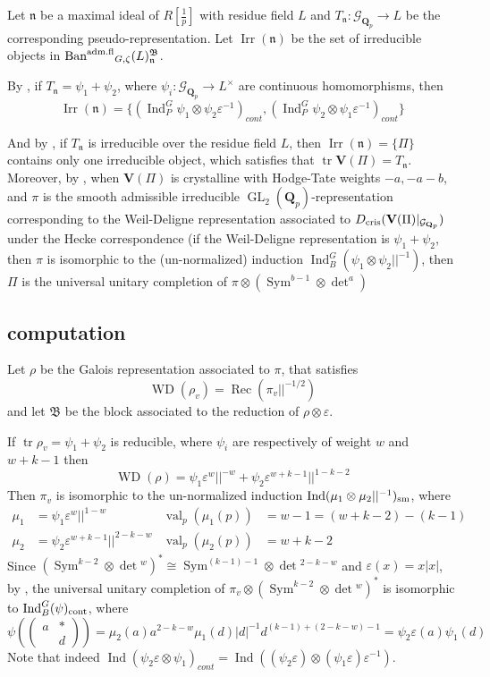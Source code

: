 \documentclass[leqno]{amsart}
\newcommand{\smat}[1]{\left( \begin{smallmatrix} #1 \end{smallmatrix} \right)}
\newcommand{\Gp}{\mathcal{G}_{\Qp}} %
\DeclareMathOperator{\Ban}{\textnormal{Ban}^{\textnormal{adm.fl}}}
\DeclareMathOperator{\Irr}{Irr}
\DeclareMathOperator{\WD}{WD}
\newcommand{\cris}{\textnormal{cris}}
\newcommand{\cont}{\textnormal{cont}}
\newcommand{\sm}{\textnormal{sm}}
\DeclareMathOperator{\GL}{GL}
\DeclareMathOperator{\mtr}{tr}
\DeclareMathOperator{\Sym}{Sym}
\DeclareMathOperator{\val}{val}
\newcommand{\Qp}{\mathbf{Q}_p}
\newcommand{\1}{\mathbf{1}}
\newcommand{\B}{\mathfrak B}
\newcommand{\fn}{\mathfrak n}
\DeclareMathOperator{\Ind}{Ind}
\DeclareMathOperator{\Rec}{Rec}
\theoremstyle{definition}
\theoremstyle{remark}
\begin{document}
Let $\fn$ be a maximal ideal of  $R[\frac{1}{p}]$
with residue field  $L$ and 
$T_\fn\colon \Gp\to L$ 
be the corresponding pseudo-representation.
Let  $\Irr(\fn)$
be the set of irreducible objects in  $\Ban_{G,\zeta}(L)^\B_{\fn}$.

By \cite[Cor 8.15]{pask}, 
if $T_\fn=\psi_1+\psi_2$,
where  $\psi_i\colon \Gp\to L^\times$
are continuous homomorphisms, then  
\begin{equation}\label{eq:comple1}
	\Irr(\fn)=\{(\Ind_P^G\psi_1\otimes\psi_2\varepsilon^{-1})_{cont},
	(\Ind_P^G\psi_2\otimes\psi_1\varepsilon^{-1})_{cont}\}
\end{equation}

And by \cite[Cor 8.14]{pask}, 
if $T_\fn$ is irreducible over the residue field $L$, 
then $\Irr(\fn)=\{\Pi\}$ contains only one irreducible object,
which satisfies that $\mtr\mathbf{V}(\Pi)=T_\fn$.
Moreover, by \cite[Thm. 1.3]{CDP},
when $\mathbf{V}(\Pi)$ is crystalline with Hodge-Tate weights $-a,-a-b$,
and $\pi$ is the smooth admissible irreducible
$\GL_2(\Qp)$-representation
corresponding to the Weil-Deligne representation
associated to  $D_{\cris}(\mathbf{V}(\Pi)\vert_{\Gp})$
under the Hecke correspondence
(if the Weil-Deligne representation is $\psi_1+\psi_2$,
then $\pi$ is isomorphic to 
the (un-normalized) induction $\Ind_B^G(\psi_1\otimes\psi_2||^{-1})$,
then $\Pi$ is the universal unitary completion
of  $\pi\otimes(\Sym^{b-1}\otimes \det^a)$


\subsection{computation}

Let $\rho$ be the Galois representation
associated to  $\pi$, that satisfies
\[
	\WD(\rho_v)=\Rec(\pi_v||^{-1/2})
\]
and let $\B$ be the block associated to the reduction
of  $\rho\otimes\varepsilon$.

If $\mtr\rho_v=\psi_1+\psi_2$ is reducible,
where $\psi_i$ are respectively of weight
$w$ and  $w+k-1$
then 
\[
	\WD(\rho)=\psi_1\varepsilon^w||^{-w}+
	\psi_2\varepsilon^{w+k-1}||^{1-k-2}
\]
Then $\pi_v$ is isomorphic to the un-normalized induction
$\Ind(\mu_1\otimes\mu_2||^{-1})_{\sm}$, where
\begin{align*}
	\mu_1&=\psi_1\varepsilon^{w}||^{1-w} &
	\val_p(\mu_1(p))&=w-1=(w+k-2)-(k-1)\\
	\mu_2&=\psi_2\varepsilon^{w+k-1}||^{2-k-w} &
	\val_p(\mu_2(p))&=w+k-2
\end{align*}
Since $(\Sym^{k-2}\otimes\det{}^w)^*\cong \Sym^{(k-1)-1}\otimes\det{}^{2-k-w}$
and $\varepsilon(x)=x|x|$,
by \cite[Thm 12.3]{pask}, 
the universal unitary completion
of $\pi_v\otimes(\Sym^{k-2}\otimes\det{}^w)^*$
is isomorphic to $\Ind_B^G(\psi)_{\cont}$, where
\[
	\psi(\smat{a&*\\&d})=\mu_2(a)a^{2-k-w}\mu_1(d)|d|^{-1}d^{(k-1)+(2-k-w)-1}
	=\psi_2\varepsilon(a)\psi_1(d)
\]
Note that indeed 
$\Ind(\psi_2\varepsilon\otimes\psi_1)_{cont}=
\Ind((\psi_2\varepsilon)\otimes(\psi_1\varepsilon)\varepsilon^{-1})$.
\end{document}
